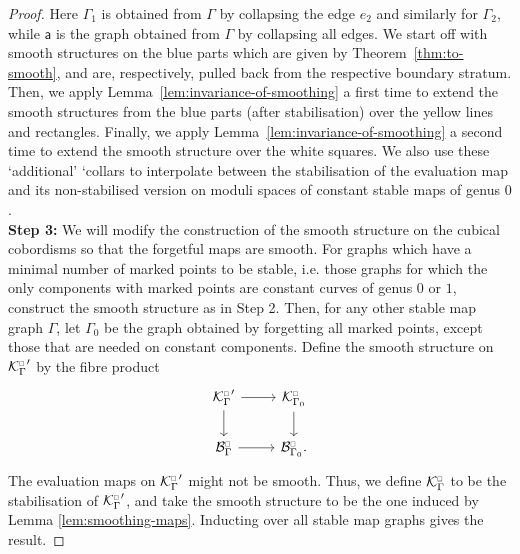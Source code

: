 \documentclass[11pt,psamsfonts, oneside, reqno]{amsart}
\newcommand{\cB}{\mathcal{B}}
\newcommand{\cK}{\mathcal{K}}
\newcommand{\cKc}{\cK^{\scale{\square}{0.6}}}
\newcommand{\scale}[2]{\scaleobj{#2}{#1}}
\newcommand{\cBc}{\cB^{\scale{\square}{0.6}}}
\theoremstyle{definition}
\theoremstyle{remark}
\numberwithin{equation}{section}
\begin{document}
\begin{proof}
	\noindent
	Here $\Gamma_1$ is obtained from $\Gamma$ by collapsing the edge $e_2$ and similarly for $\Gamma_2$, while $\mathsf{a}$ is the graph obtained from $\Gamma$ by collapsing all edges. 
 We start off with smooth structures on the blue parts which are given by Theorem~\ref{thm:to-smooth}, and are, respectively, pulled back from the respective boundary stratum. Then, we apply Lemma~\ref{lem:invariance-of-smoothing} a first time to extend the smooth structures from the blue parts (after stabilisation) over the yellow lines and rectangles. Finally, we apply Lemma~\ref{lem:invariance-of-smoothing} a second time to extend the smooth structure over the white squares. We also use these `additional' `collars to interpolate between the stabilisation of the evaluation map and its non-stabilised version on moduli spaces of constant stable maps of genus $0$.\\
 
 \noindent\textbf{Step 3:} We will modify the construction of the smooth structure on the cubical cobordisms so that the forgetful maps are smooth. For graphs which have a minimal number of marked points to be stable, i.e. those graphs for which the only components with marked points are constant curves of genus $0$ or $1$, construct the smooth structure as in Step 2. Then, for any other stable map graph $\Gamma$, let $\Gamma_0$ be the graph obtained by forgetting all marked points, except those that are needed on constant components. Define the smooth structure on ${\cKc_\Gamma}'$ by the fibre product 
 \begin{equation*}
 	\begin{tikzcd}
 		{\cKc_\Gamma}' \arrow[r,""] \arrow[d,""]&{\cKc_{\Gamma_0}} \arrow[d,""]\\ 
 		\cBc_\Gamma \arrow[r,""] &\cBc_{\Gamma_0}.
 		\end{tikzcd} 
 	\end{equation*}
 	The evaluation maps on ${\cKc_\Gamma}'$ might not be smooth. Thus, we define ${\cKc_\Gamma}$ to be the stabilisation of ${\cKc_\Gamma}'$, and take the smooth structure to be the one induced by Lemma \ref{lem:smoothing-maps}. Inducting over all stable map graphs gives the result.
\end{proof}
\end{document}

